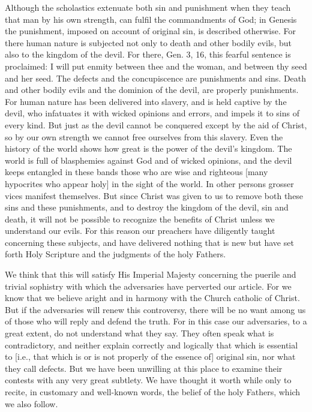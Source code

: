 Although the scholastics extenuate both sin and punishment when they
teach that man by his own strength, can fulfil the commandments of
God; in Genesis the punishment, imposed on account of original sin,
is described otherwise.  For there human nature is subjected not only
to death and other bodily evils, but also to the kingdom of the devil.
For there, Gen. 3, 16, this fearful sentence is proclaimed: I will
put enmity between thee and the woman, and between thy seed and her
seed.  The defects and the concupiscence are punishments and sins.
Death and other bodily evils and the dominion of the devil, are
properly punishments.  For human nature has been delivered into
slavery, and is held captive by the devil, who infatuates it with
wicked opinions and errors, and impels it to sins of every kind.  But
just as the devil cannot be conquered except by the aid of Christ, so
by our own strength we cannot free ourselves from this slavery.  Even
the history of the world shows how great is the power of the devil's
kingdom.  The world is full of blasphemies against God and of wicked
opinions, and the devil keeps entangled in these bands those who are
wise and righteous [many hypocrites who appear holy] in the sight of
the world.  In other persons grosser vices manifest themselves.  But
since Christ was given to us to remove both these sins and these
punishments, and to destroy the kingdom of the devil, sin and death,
it will not be possible to recognize the benefits of Christ unless we
understand our evils.  For this reason our preachers have diligently
taught concerning these subjects, and have delivered nothing that is
new but have set forth Holy Scripture and the judgments of the holy
Fathers.

We think that this will satisfy His Imperial Majesty concerning the
puerile and trivial sophistry with which the adversaries have
perverted our article.  For we know that we believe aright and in
harmony with the Church catholic of Christ.  But if the adversaries
will renew this controversy, there will be no want among us of those
who will reply and defend the truth.  For in this case our
adversaries, to a great extent, do not understand what they say.
They often speak what is contradictory, and neither explain correctly
and logically that which is essential to [i.e., that which is or is
not properly of the essence of] original sin, nor what they call
defects.  But we have been unwilling at this place to examine their
contests with any very great subtlety.  We have thought it worth
while only to recite, in customary and well-known words, the belief
of the holy Fathers, which we also follow.




